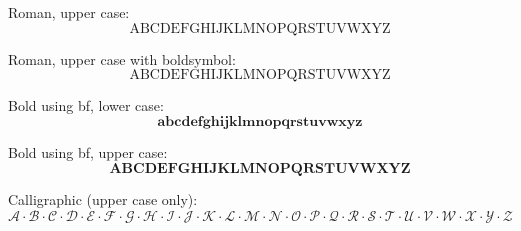 \documentclass[12pt,a4paper]{article}
\theoremstyle{clearprint}
\begin{document}
\noindent 
Roman, upper case:
\begin{equation}
\mathrm{A}  \mathrm{B}  \mathrm{C}  \mathrm{D}  \mathrm{E}  \mathrm{F}  \mathrm{G}  \mathrm{H}  \mathrm{I}  \mathrm{J}  \mathrm{K}  \mathrm{L}  \mathrm{M}  \mathrm{N}  \mathrm{O}  \mathrm{P}  \mathrm{Q}  \mathrm{R}  \mathrm{S}  \mathrm{T}  \mathrm{U}  \mathrm{V}  \mathrm{W}  \mathrm{X}  \mathrm{Y}  \mathrm{Z}
\end{equation}

\noindent 
Roman, upper case with boldsymbol:
\begin{equation}
\boldsymbol{\mathrm{A}  \mathrm{B}  \mathrm{C}  \mathrm{D}  \mathrm{E}  \mathrm{F}  \mathrm{G}  \mathrm{H}  \mathrm{I}  \mathrm{J}  \mathrm{K}  \mathrm{L}  \mathrm{M}  \mathrm{N}  \mathrm{O}  \mathrm{P}  \mathrm{Q}  \mathrm{R}  \mathrm{S}  \mathrm{T}  \mathrm{U}  \mathrm{V}  \mathrm{W}  \mathrm{X}  \mathrm{Y}  \mathrm{Z}}
\end{equation}

\noindent 
Bold using bf, lower case:
\begin{equation}
\mathbf{a}  \mathbf{b}  \mathbf{c}  \mathbf{d}  \mathbf{e}  \mathbf{f}  \mathbf{g}  \mathbf{h}  \mathbf{i}  \mathbf{j}  \mathbf{k}  \mathbf{l}  \mathbf{m}  \mathbf{n}  \mathbf{o}  \mathbf{p}  \mathbf{q}  \mathbf{r}  \mathbf{s}  \mathbf{t}  \mathbf{u}  \mathbf{v}  \mathbf{w}  \mathbf{x}  \mathbf{y}  \mathbf{z}
\end{equation}

\noindent 
Bold using bf, upper case:
\begin{equation}
\mathbf{A}  \mathbf{B}  \mathbf{C}  \mathbf{D}  \mathbf{E}  \mathbf{F}  \mathbf{G}  \mathbf{H}  \mathbf{I}  \mathbf{J}  \mathbf{K}  \mathbf{L}  \mathbf{M}  \mathbf{N}  \mathbf{O}  \mathbf{P}  \mathbf{Q}  \mathbf{R}  \mathbf{S}  \mathbf{T}  \mathbf{U}  \mathbf{V}  \mathbf{W}  \mathbf{X}  \mathbf{Y}  \mathbf{Z}
\end{equation}

\noindent 
Calligraphic (upper case only):
\begin{equation}
\mathcal{A} \cdot \mathcal{B} \cdot \mathcal{C} \cdot \mathcal{D} \cdot \mathcal{E} \cdot \mathcal{F} \cdot \mathcal{G} \cdot \mathcal{H} \cdot \mathcal{I} \cdot \mathcal{J} \cdot \mathcal{K} \cdot \mathcal{L} \cdot \mathcal{M} \cdot \mathcal{N} \cdot \mathcal{O} \cdot \mathcal{P} \cdot \mathcal{Q} \cdot \mathcal{R} \cdot \mathcal{S} \cdot \mathcal{T} \cdot \mathcal{U} \cdot \mathcal{V} \cdot \mathcal{W} \cdot \mathcal{X} \cdot \mathcal{Y} \cdot \mathcal{Z}
\end{equation}
\end{document}
